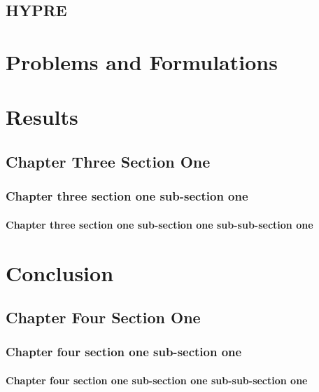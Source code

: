 \section{HYPRE}





\chapter{Problems and Formulations}

\chapter{Results}
\section{Chapter Three Section One}
\subsection{Chapter three section one sub-section one}
\subsubsection{Chapter three section one sub-section one sub-sub-section one}


\chapter{Conclusion}
\section{Chapter Four Section One}
\subsection{Chapter four section one sub-section one}
\subsubsection{Chapter four section one sub-section one sub-sub-section one}

